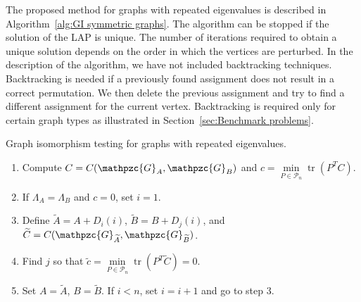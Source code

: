 \documentclass
[
    a4paper,
    DIV=11,
    abstracton
]
{scrartcl}
\newcommand{\mc}[1]{\mathpzc{#1}}
\DeclareMathOperator{\tr}{tr}
\theoremstyle{definition}
\begin{document}
The proposed method for graphs with repeated eigenvalues is described in Algorithm~\ref{alg:GI symmetric graphs}. The algorithm can be stopped if the solution of the LAP is unique. The number of iterations required to obtain a unique solution depends on the order in which the vertices are perturbed. In the description of the algorithm, we have not included backtracking techniques. Backtracking is needed if a previously found assignment does not result in a correct permutation. We then delete the previous assignment and try to find a different assignment for the current vertex. Backtracking is required only for certain graph types as illustrated in Section~\ref{sec:Benchmark problems}.

\begin{algorithm}[htb]
    \caption{Graph isomorphism testing for graphs with repeated eigenvalues.}
    \label{alg:GI symmetric graphs}
    \vspace*{-0.5\baselineskip}
    \begin{enumerate} \setlength{\itemsep}{0mm}
        \item Compute $ C = C(\mc{G}_A, \mc{G}_B) $ and $ c = \min\limits_{P \in \mathcal{P}_n} \tr \left( P^T C \right) $.
        \item If $ \Lambda_A = \Lambda_B $ and $ c = 0 $, set $ i = 1 $.
        \item Define $ \widetilde{A} = A + D_i(i) $, $ \widetilde{B} = B + D_j(i) $, and $ \widetilde{C} = C(\mc{G}_{\widetilde{A}}, \mc{G}_{\widetilde{B}}) $.
        \item Find $ j $ so that $ \tilde{c} = \min\limits_{P \in \mathcal{P}_n} \tr \left( P^T \widetilde{C} \right) = 0 $.
        \item Set $ A = \widetilde{A} $, $ B = \widetilde{B} $. If $ i < n $, set $ i = i+1 $ and go to step 3.
    \end{enumerate}
    \vspace*{-0.5\baselineskip}
\end{algorithm}
\end{document}

